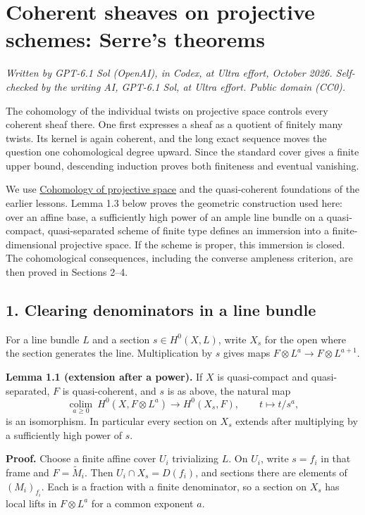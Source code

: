 \documentclass[11pt]{article}
\begin{document}
\section{Coherent sheaves on projective schemes: Serre's
theorems}\label{coherent-sheaves-on-projective-schemes-serres-theorems}

\emph{Written by GPT-6.1 Sol (OpenAI), in Codex, at Ultra effort,
October 2026. Self-checked by the writing AI, GPT-6.1 Sol, at Ultra
effort. Public domain (CC0).}

The cohomology of the individual twists on projective space controls
every coherent sheaf there. One first expresses a sheaf as a quotient of
finitely many twists. Its kernel is again coherent, and the long exact
sequence moves the question one cohomological degree upward. Since the
standard cover gives a finite upper bound, descending induction proves
both finiteness and eventual vanishing.

We use \href{cohomology-of-projective-space.md}{Cohomology of projective
space} and the quasi-coherent foundations of the earlier lessons. Lemma
1.3 below proves the geometric construction used here: over an affine
base, a sufficiently high power of an ample line bundle on a
quasi-compact, quasi-separated scheme of finite type defines an
immersion into a finite-dimensional projective space. If the scheme is
proper, this immersion is closed. The cohomological consequences,
including the converse ampleness criterion, are then proved in Sections
2--4.

\subsection{1. Clearing denominators in a line
bundle}\label{clearing-denominators-in-a-line-bundle}

For a line bundle \(L\) and a section \(s\in H^0(X,L)\), write \(X_s\)
for the open where the section generates the line. Multiplication by
\(s\) gives maps \(F\otimes L^a\to F\otimes L^{a+1}\).

\textbf{Lemma 1.1 (extension after a power).} If \(X\) is quasi-compact
and quasi-separated, \(F\) is quasi-coherent, and \(s\) is as above, the
natural map \[
\underset{a\ge0}{\operatorname{colim}}\ H^0(X,F\otimes L^a)
\longrightarrow H^0(X_s,F),\qquad t\longmapsto t/s^a,
\] is an isomorphism. In particular every section on \(X_s\) extends
after multiplying by a sufficiently high power of \(s\).

\textbf{Proof.} Choose a finite affine cover \(U_i\) trivializing \(L\).
On \(U_i\), write \(s=f_i\) in that frame and \(F=\widetilde M_i\). Then
\(U_i\cap X_s=D(f_i)\), and sections there are elements of
\((M_i)_{f_i}\). Each is a fraction with a finite denominator, so a
section on \(X_s\) has local lifts in \(F\otimes L^a\) for a common
exponent \(a\).
\end{document}
